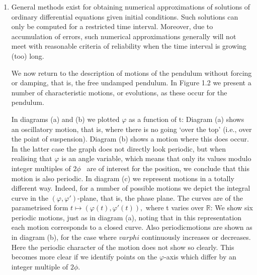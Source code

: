 \documentclass[12pt]{article}
\begin{document}
\begin{enumerate}
\item General methods exist for obtaining numerical approximations of solutions of
ordinary differential equations given initial conditions. Such solutions can only
be computed for a restricted time interval. Moreover, due to accumulation of
errors, such numerical approximations generally will not meet with reasonable
criteria of reliability when the time interval is growing (too) long.

\hfill

We now return to the description of motions of the pendulum without forcing or
damping, that is, the free undamped pendulum. In Figure 1.2 we present a number
of characteristic motions, or evolutions, as these occur for the pendulum.

\hfill

In diagrams (a) and (b) we plotted $\varphi$ as a function of t: Diagram (a) shows an
oscillatory motion, that is, where there is no going ‘over the top’ (i.e., over the
point of suspension). Diagram (b) shows a motion where this does occur. In the
latter case the graph does not directly look periodic, but when realising that $\varphi$ is
an angle variable, which means that only its values modulo integer multiples of $2\phi$ 
are of interest for the position, we conclude that this motion is also periodic. In
diagram (c) we represent motions in a totally different way. Indeed, for a number of
possible motions we depict the integral curve in the $(\varphi, \varphi')$-plane, that is, the phase
plane. The curves are of the parametrised form $t \mapsto (\varphi(t), \varphi'(t)),$ where t varies
over $\mathbb{R}$: We show six periodic motions, just as in diagram (a), noting that in this
representation each motion corresponds to a closed curve. Also periodicmotions are
shown as in diagram (b), for the case where $varphi$ continuously increases or decreases.
Here the periodic character of the motion does not show so clearly. This becomes
more clear if we identify points on the $\varphi$-axis which differ by an integer multiple
of $2\phi$.

\hfill


\end{enumerate}
\end{document}
